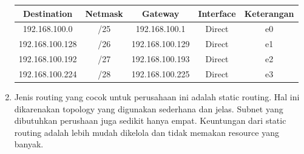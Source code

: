 \begin{enumerate}
\begin{tabular}{|c|c|c|c|c|}
        \hline
        Destination & Netmask & Gateway & Interface & Keterangan \\
        \hline
        192.168.100.0 & /25    & 192.168.100.1    & Direct    & e0    \\
        \hline
        192.168.100.128 & /26    & 192.168.100.129    & Direct    & e1    \\
        \hline
        192.168.100.192 & /27    & 192.168.100.193    & Direct    & e2   \\
        \hline
        192.168.100.224 & /28    & 192.168.100.225    & Direct    & e3    \\
        \hline
        \end{tabular}

    \item Jenis routing yang cocok untuk perusahaan ini adalah static routing. Hal ini dikarenakan topology yang digunakan sederhana dan jelas. Subnet yang dibutuhkan perushaan juga sedikit hanya empat. Keuntungan dari static routing adalah lebih mudah dikelola dan tidak memakan resource yang banyak.
        
\end{enumerate}